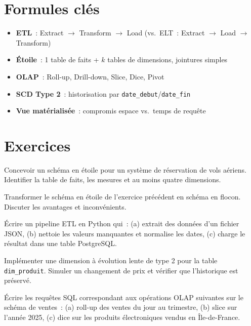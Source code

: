 \section{Formules cl\'es}

\begin{formules}
\begin{itemize}
  \item \textbf{ETL}~: Extract $\to$ Transform $\to$ Load (vs.\ ELT~: Extract $\to$ Load $\to$ Transform)
  \item \textbf{\'Etoile}~: 1 table de faits + $k$ tables de dimensions, jointures simples
  \item \textbf{OLAP}~: Roll-up, Drill-down, Slice, Dice, Pivot
  \item \textbf{SCD Type 2}~: historisation par \texttt{date\_debut}/\texttt{date\_fin}
  \item \textbf{Vue mat\'erialis\'ee}~: compromis espace vs.\ temps de requ\^ete
\end{itemize}
\end{formules}

\section{Exercices}

\begin{exercice}
Concevoir un sch\'ema en \'etoile pour un syst\`eme de r\'eservation de
vols a\'eriens. Identifier la table de faits, les mesures et au moins
quatre dimensions.
\end{exercice}

\begin{exercice}
Transformer le sch\'ema en \'etoile de l'exercice pr\'ec\'edent en sch\'ema
en flocon. Discuter les avantages et inconv\'enients.
\end{exercice}

\begin{exercice}
\'Ecrire un pipeline ETL en Python qui~: (a) extrait des donn\'ees d'un
fichier JSON, (b) nettoie les valeurs manquantes et normalise les dates,
(c) charge le r\'esultat dans une table PostgreSQL.
\end{exercice}

\begin{exercice}
Impl\'ementer une dimension \`a \'evolution lente de type 2 pour la table
\texttt{dim\_produit}. Simuler un changement de prix et v\'erifier que
l'historique est pr\'eserv\'e.
\end{exercice}

\begin{exercice}
\'Ecrire les requ\^etes SQL correspondant aux op\'erations OLAP suivantes
sur le sch\'ema de ventes~: (a) roll-up des ventes du jour au trimestre,
(b) slice sur l'ann\'ee 2025, (c) dice sur les produits \'electroniques
vendus en \^Ile-de-France.
\end{exercice}
